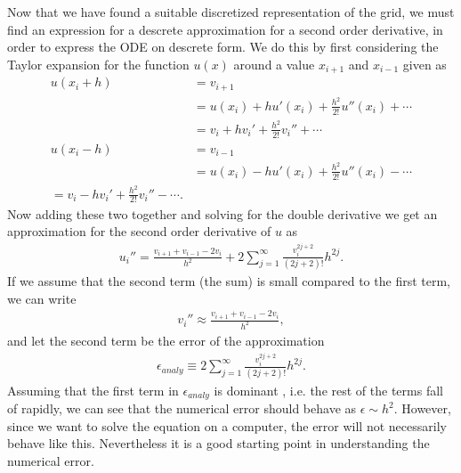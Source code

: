 \documentclass[twocolumn]{aastex62}
\begin{document}
Now that we have found a suitable discretized representation of the grid, we must find an expression for a descrete approximation for a second order derivative, in order to express the ODE on descrete form. We do this by first considering the Taylor expansion for the function $u(x)$ around a value $x_{i+1} $ and $x_{i-1}$ given as
\begin{align}
	u(x_i + h) &= v_{i+1} \\
	&= u(x_i) + hu'(x_i) + \frac{h^2}{2!}u''(x_i) +\cdots\\
	&= v_i + hv_i' + \frac{h^2}{2!}v_i'' + \cdots\\
	u(x_i - h) &= v_{i-1} \\
	& = u(x_i) - hu'(x_i) + \frac{h^2}{2!}u''(x_i) -\cdots\\
	= v_i - hv_i' + \frac{h^2}{2!}v_i'' - \cdots.
\end{align} 
Now adding these two together and solving for the double derivative we get an approximation for the second order derivative of $u$ as 
\begin{align}
	u_i'' = \frac{v_{i+1} + v_{i-1} - 2v_i}{h^2} + 2\sum^\infty_{j=1} \frac{v_i^{2j+2}}{(2j + 2)!}h^{2j}.
\end{align}
If we assume that the second term (the sum) is small compared to the first term, we can write 
\begin{align}
	v_i''\approx \frac{v_{i+1} + v_{i-1} - 2v_i}{h^2},
\end{align}
and let the second term be the error of the approximation
\begin{align}
	\epsilon_{analy} \equiv 2\sum^\infty_{j=1} \frac{v_i^{2j+2}}{(2j + 2)!}h^{2j}.
\end{align} Assuming that the first term in $\epsilon_{analy}$ is dominant , i.e. the rest of the terms fall of rapidly, we can see that the numerical error should behave as $\epsilon\sim h^2$. However, since we want to solve the equation on a computer, the error will not necessarily behave like this. Nevertheless it is a good starting point in understanding the numerical error. 
\end{document}
